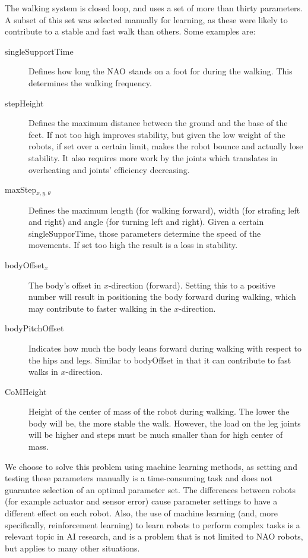 \documentclass[a4paper, twocolumn]{article}
\begin{document}
The walking system is closed loop, and uses a set of more than thirty parameters. A subset of this set was selected manually for learning, as these were likely to contribute to a stable and fast walk than others.
Some examples are:
\begin{description}
\item[singleSupportTime] Defines how long the NAO stands on a foot for during the walking. This determines the walking frequency.
\item[stepHeight] Defines the maximum distance between the ground and the base of the feet. If not too high improves stability, but given the low weight of the robots, if set over a certain limit, makes the robot bounce and actually lose stability. It also requires more work by the joints which translates in overheating and joints' efficiency decreasing. 
\item[maxStep$_{x,y, \theta }$] Defines the maximum length (for walking forward), width (for strafing left and right) and angle (for turning left and right). Given a certain singleSupporTime, those parameters determine the speed of the movements. If set too high the result is a loss in stability.
\item[bodyOffset$_{x}$] The body's offset in $x$-direction (forward). Setting this to a positive number will result in positioning the body forward during walking, which may contribute to faster walking in the $x$-direction.
\item[bodyPitchOffset] Indicates how much the body leans forward during walking with respect to the hips and legs. Similar to bodyOffset in that it can contribute to fast walks in $x$-direction. 
\item[CoMHeight] Height of the center of mass of the robot during walking. The lower the body will be, the more stable the walk. However, the load on the leg joints will be higher and steps must be much smaller than for high center of mass. 
\end{description}

We choose to solve this problem using machine learning methods, as setting and testing these parameters manually is a time-consuming task and does not guarantee selection of an optimal parameter set. The differences between robots (for example actuator and sensor error) cause parameter settings to have a different effect on each robot. Also, the use of machine learning (and, more specifically, reinforcement learning) to learn robots to perform complex tasks is a relevant topic in AI research, and is a problem that is not limited to NAO robots, but applies to many other situations. 
\end{document}
